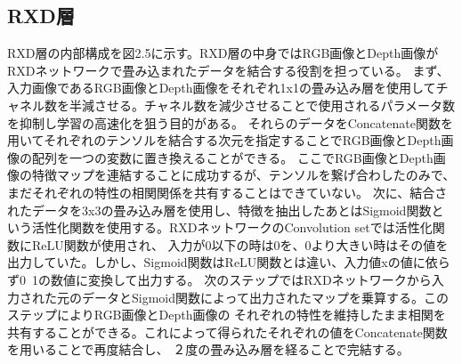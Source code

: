 \subsection{RXD層}
RXD層の内部構成を図2.5に示す。RXD層の中身ではRGB画像とDepth画像がRXDネットワークで畳み込まれたデータを結合する役割を担っている。
まず、入力画像であるRGB画像とDepth画像をそれぞれ1x1の畳み込み層を使用してチャネル数を半減させる。チャネル数を減少させることで使用されるパラメータ数を抑制し学習の高速化を狙う目的がある。
それらのデータをConcatenate関数を用いてそれぞれのテンソルを結合する次元を指定することでRGB画像とDepth画像の配列を一つの変数に置き換えることができる。
ここでRGB画像とDepth画像の特徴マップを連結することに成功するが、テンソルを繋げ合わしたのみで、まだそれぞれの特性の相関関係を共有することはできていない。
次に、結合されたデータを3x3の畳み込み層を使用し、特徴を抽出したあとはSigmoid関数という活性化関数を使用する。RXDネットワークのConvolution setでは活性化関数にReLU関数が使用され、
入力が0以下の時は0を、0より大きい時はその値を出力していた。しかし、Sigmoid関数はReLU関数とは違い、入力値xの値に依らず0~1の数値に変換して出力する。
次のステップではRXDネットワークから入力された元のデータとSigmoid関数によって出力されたマップを乗算する。このステップによりRGB画像とDepth画像の
それぞれの特性を維持したまま相関を共有することができる。これによって得られたそれぞれの値をConcatenate関数を用いることで再度結合し、
２度の畳み込み層を経ることで完結する。



